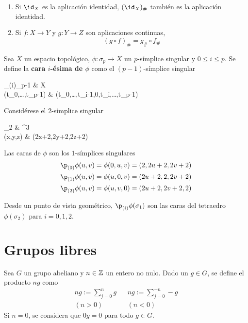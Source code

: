 \begin{proposition}
	\begin{enumerate}
	\item Si $\id_X$ es la aplicación identidad, $(\id_X)_\#$ también es la aplicación identidad.
	\item Si $f\colon X \to Y$ y $g\colon Y \to Z$ son aplicaciones continuas,
		\[(g\circ f)_\#=g_\#\circ f_\#\]
	\end{enumerate}
\end{proposition}

Sea $X$ un espacio topológico, $\phi\colon \sigma_p \to X$ un $p$-símplice singular y $0 \leq i \leq p$.
Se define la \textbf{cara $i$-ésima de $\phi$} como el $(p-1)$-símplice singular
\begin{funcion}
	\p_{(i)}\phi\colon \sigma_{p-1} \arrow[r] & X \\
	{(t_0,\dots,t_{p-1})} \arrow[r, maps to] &
	\phi(t_0,\dots,t_{i-1},0,t_{i},\dots,t_{p-1})
\end{funcion}

\begin{example}
Considérese el 2-símplice singular
\begin{funcion}
	\phi\colon  \sigma_2 \arrow[r] & ^3 \\
	(x,y,z) \arrow[r, maps to] & (2x+2,2y+2,2z+2)
\end{funcion}

Las caras de $\phi$ son los $1$-símplices singulares
\begin{align*}
	\p_{(0)}\phi(u,v)&=\phi(0,u,v)=(2,2u+2,2v+2)\\
	\p_{(1)}\phi(u,v)&=\phi(u,0,v)=(2u+2,2,2v+2)\\
	\p_{(2)}\phi(u,v)&=\phi(u,v,0)=(2u+2,2v+2,2)
\end{align*}

Desde un punto de vista geométrico, $\p_{(i)}\phi(\sigma_1)$ son las caras del tetraedro $\phi(\sigma_2)$ para $i=0,1,2$.
\end{example}

\section{Grupos libres}
Sea $G$ un grupo abeliano y $n \in \mathbb{Z}$ un entero no nulo.
Dado un $g \in G$, se define el producto $ng$ como
\begin{align*}
	ng:=\sum^n_{j=0}g	&& ng:=\sum^{-n}_{j=0}-g\\
	(n>0)				&& (n < 0)
\end{align*}
Si $n=0$, se considera que $0g=0$ para todo $g \in G$.

